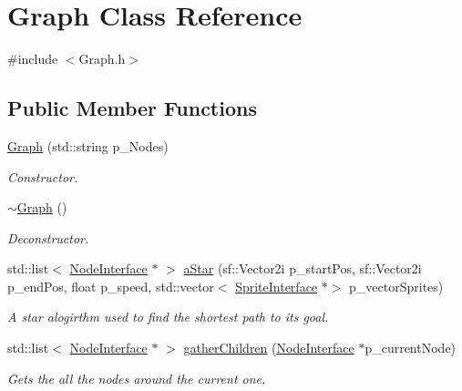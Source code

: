 \hypertarget{class_graph}{}\section{Graph Class Reference}
\label{class_graph}


{\ttfamily \#include $<$Graph.\+h$>$}

\subsection*{Public Member Functions}
\begin{DoxyCompactItemize}
\item 
\mbox{\label{class_graph_a46dc3eb41a95c8173c20fea26c17b925}} 
\mbox{\hyperlink{class_graph_a46dc3eb41a95c8173c20fea26c17b925}{Graph}} (std\+::string p\+\_\+\+Nodes)
\begin{DoxyCompactList}\small\item\em Constructor. \end{DoxyCompactList}\item 
\mbox{\hyperlink{class_graph_a902c5b3eacb66d60752525ab23297a95}{$\sim$\+Graph}} ()
\begin{DoxyCompactList}\small\item\em Deconstructor. \end{DoxyCompactList}\item 
\mbox{\label{class_graph_a3ee5732e000ce109e64c8aa5b2402781}} 
std\+::list$<$ \mbox{\hyperlink{class_node_interface}{Node\+Interface}} $\ast$ $>$ \mbox{\hyperlink{class_graph_a3ee5732e000ce109e64c8aa5b2402781}{a\+Star}} (sf\+::\+Vector2i p\+\_\+start\+Pos, sf\+::\+Vector2i p\+\_\+end\+Pos, float p\+\_\+speed, std\+::vector$<$ \mbox{\hyperlink{class_sprite_interface}{Sprite\+Interface}} $\ast$$>$ p\+\_\+vector\+Sprites)
\begin{DoxyCompactList}\small\item\em A star alogirthm used to find the shortest path to its goal. \end{DoxyCompactList}\item 
std\+::list$<$ \mbox{\hyperlink{class_node_interface}{Node\+Interface}} $\ast$ $>$ \mbox{\hyperlink{class_graph_afe3384c94b3e2c3aeedf177092323598}{gather\+Children}} (\mbox{\hyperlink{class_node_interface}{Node\+Interface}} $\ast$p\+\_\+current\+Node)
\begin{DoxyCompactList}\small\item\em Gets the all the nodes around the current one. \end{DoxyCompactList}\item 
$$
\end{DoxyCompactItemize}
